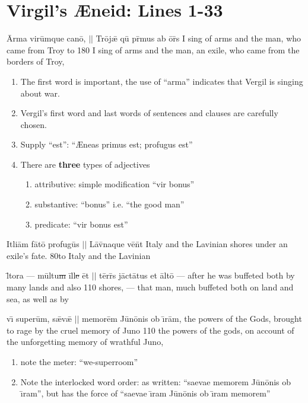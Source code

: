 \documentclass[]{article}
\begin{document}
\section*{Virgil's {\AE}neid:  Lines 1-33} %


\latline
  {\={\macron A}rm\-a v\-ir\=umqu\-e c\-an{\={\macron o}}, $||$ Tr\={o}j\={\ae} qu\={\macron{\i}} pr\={\macron{\i}}m\-us \-ab \={o}r\={\macron{\i}}s}
	{I sing of arms and the man, who came from Troy to}
  {180}
	{I sing of arms and the man, an exile, who came from the borders of Troy,}
	{
	\begin{enumerate}
			\item The first word is important, the use of ``arma'' indicates that Vergil is singing about war.
			\item Vergil's first word and last words of sentences and clauses are carefully chosen.
			\item Supply ``est'':  ``{\AE}neas primus est; profugus est''
			\item There are \textbf{three} types of adjectives
			\begin{enumerate}
				\item attributive: simple modification ``vir bonus''
				\item substantive:  ``bonus'' i.e. ``the good man''
				\item predicate:  ``vir bonus est''
			\end{enumerate}
		 \end{enumerate}	
	}

\latline
		{{\macron I}tl\-i\={a}m f\={\macron a}t\={\macron o} pr\-of\-ug\={\macron u}s $||$ L\={\macron a}v\={\macron{\i}}n\-aqu\-e v\={\macron e}n\={\macron{\i}}t}
		{Italy and the Lavinian shores under an exile's fate.}
		{80}{to Italy and the Lavinian }{}

\latline
{l\={\macron{\i}}t\-or\-a --- m\=ultu\sout{m }\={i}ll\={{\sout{e }}\=e}t $||$ t\=err\={\macron{\i}}s j\=act\={\macron a}t\-us \-et \=alt\={\macron o}}
{--- after he was buffeted both by many lands and also}
{110}
{shores, --- that man, much buffeted both on land and sea, as well as by}
{}

\newpage
\latline
{v\={\i} s\-up\-er\=um, s\={\ae}v\={\ae} $||$ m\-em\-or\=em J\={u}n\={o}n\-is \-ob \={\i}r\=am,}
{the powers of the Gods, brought to rage by the cruel memory of Juno}
{110}
{the powers of the gods, on account of the unforgetting memory of wrathful Juno,}
{
	\begin{enumerate}
		\item note the meter:  ``we-superroom''
		\item Note the interlocked word order:  as written: ``saevae memorem J\={u}n\={o}nis ob {\={\i}}ram'',
		but has the force of  ``saevae {\={\i}}ram J\={u}n\={o}nis ob \={\i}ram memorem''
	\end{enumerate}
}
\end{document}
